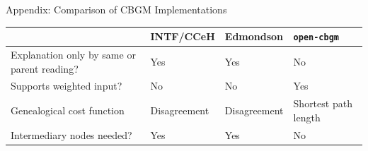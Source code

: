 \documentclass[10pt]{beamer}
\begin{document}
	\begin{frame}{Appendix: Comparison of CBGM Implementations}
		\begin{table}
			\centering
			\begin{tabular}{p{6em}p{6em}p{6em}p{4em}}
				 & \phantom{text}\newline INTF/CCeH & \phantom{text}\newline Edmondson & \texttt{open-}\newline\texttt{cbgm}\\
				\hline
				\hline
				Explanation only by same or parent reading? & Yes & Yes & No\\
				\hline
				Supports weighted input? & No & No & Yes\\
				\hline
				Genealogical cost function & Disagreement & Disagreement & Shortest path length\\
				\hline
				Intermediary nodes needed? & Yes & Yes & No
			\end{tabular}
		\end{table}
	\end{frame}
\end{document}
